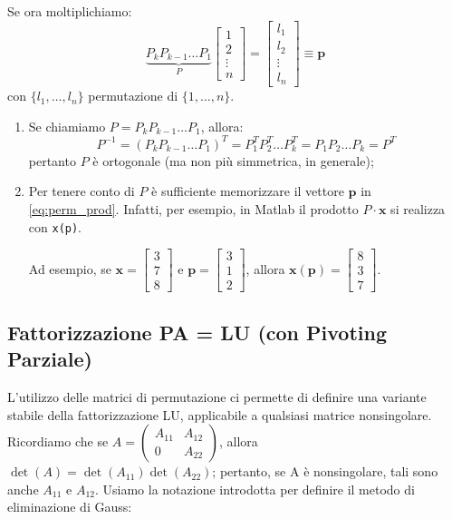 Se ora moltiplichiamo:
\begin{equation} \label{eq:perm_prod}
    \underbrace{P_k P_{k-1} \dots P_1}_{P} 
    \begin{bmatrix} 1 \\ 2 \\ \vdots \\ n \end{bmatrix} = 
    \begin{bmatrix} l_1 \\ l_2 \\ \vdots \\ l_n \end{bmatrix} \equiv \mathbf{p}
\end{equation}
con $\{l_1, \dots, l_n\}$ permutazione di $\{1, \dots, n\}$.

\begin{osservazione}
\begin{enumerate}
    \item Se chiamiamo $P = P_k P_{k-1} \dots P_1$, allora:
    $$ P^{-1} = (P_k P_{k-1} \dots P_1)^T = P_1^T P_2^T \dots P_k^T = P_1 P_2 \dots P_k = P^T $$
    pertanto $P$ è ortogonale (ma non più simmetrica, in generale);
    
    \item Per tenere conto di $P$ è sufficiente memorizzare il vettore $\mathbf{p}$ in \eqref{eq:perm_prod}.
    Infatti, per esempio, in Matlab il prodotto $P \cdot \mathbf{x}$ si realizza con \texttt{x(p)}.
    
    Ad esempio, se $\mathbf{x} = \begin{bmatrix} 3 \\ 7 \\ 8 \end{bmatrix}$ e $\mathbf{p} = \begin{bmatrix} 3 \\ 1 \\ 2 \end{bmatrix}$,
    allora $\mathbf{x}(\mathbf{p}) = \begin{bmatrix} 8 \\ 3 \\ 7 \end{bmatrix}$.
\end{enumerate}
\end{osservazione}

\subsection{Fattorizzazione PA = LU (con Pivoting Parziale)}
L'utilizzo delle matrici di permutazione ci permette di definire una variante stabile della fattorizzazione LU, applicabile a qualsiasi matrice nonsingolare.
Ricordiamo che se $A = \begin{pmatrix} A_{11} & A_{12} \\ 0 & A_{22} \end{pmatrix}$, allora $\det(A) = \det(A_{11})\det(A_{22})$; pertanto, se A è nonsingolare, tali sono anche $A_{11}$ e $A_{12}$.
Usiamo la notazione introdotta per definire il metodo di eliminazione di Gauss:

